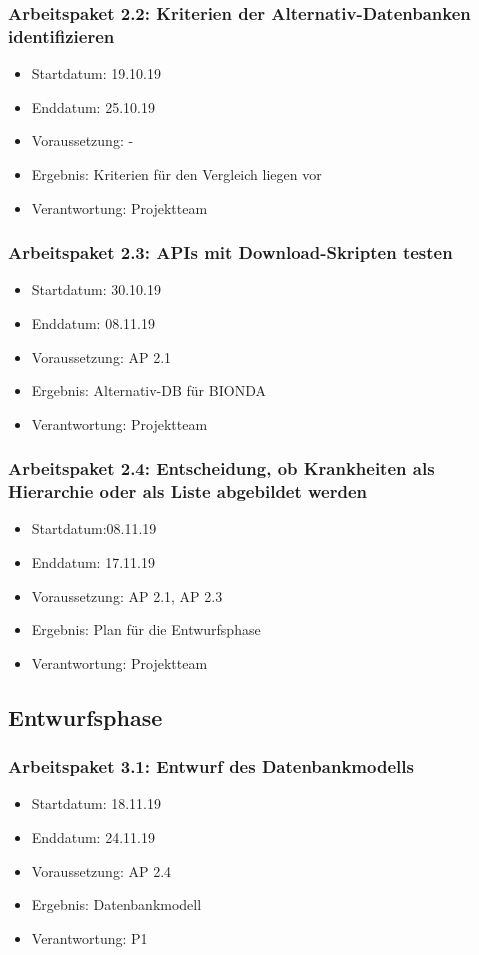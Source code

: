\subsubsection*{Arbeitspaket 2.2: Kriterien der Alternativ-Datenbanken identifizieren}
\begin{itemize}
\item Startdatum: 19.10.19
\item Enddatum: 25.10.19
\item Voraussetzung: -
\item Ergebnis: Kriterien für den Vergleich liegen vor 
\item Verantwortung: Projektteam
\end{itemize}
\subsubsection*{Arbeitspaket 2.3: APIs mit Download-Skripten testen}
\begin{itemize}
\item Startdatum: 30.10.19
\item Enddatum: 08.11.19
\item Voraussetzung: AP 2.1
\item Ergebnis: Alternativ-DB für BIONDA
\item Verantwortung: Projektteam
\end{itemize}
\subsubsection*{Arbeitspaket 2.4: Entscheidung, ob Krankheiten als Hierarchie oder als Liste abgebildet werden}
\begin{itemize}
\item Startdatum:08.11.19
\item Enddatum: 17.11.19
\item Voraussetzung: AP 2.1, AP 2.3
\item Ergebnis: Plan für die Entwurfsphase
\item Verantwortung: Projektteam
\end{itemize}
\subsection*{Entwurfsphase}
\subsubsection*{Arbeitspaket 3.1: Entwurf des Datenbankmodells}
\begin{itemize}
\item Startdatum: 18.11.19
\item Enddatum: 24.11.19
\item Voraussetzung: AP 2.4
\item Ergebnis: Datenbankmodell
\item Verantwortung: P1
\end{itemize}

